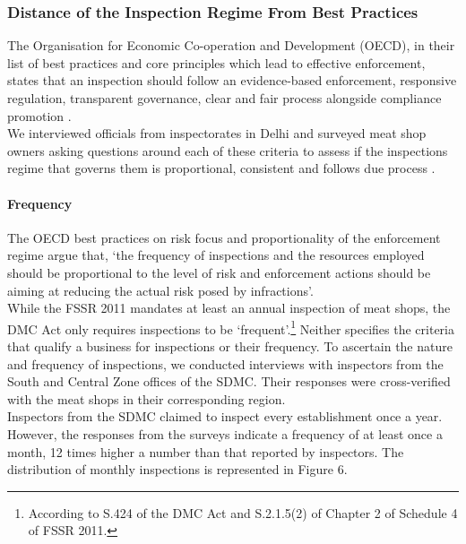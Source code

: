 \documentclass[a4paper, 12pt]{article}
\begin{document}
\subsubsection{Distance of the Inspection Regime From Best Practices}

The Organisation for Economic Co-operation and Development (OECD), in their list of best practices and core principles which lead to effective enforcement, states that an inspection should follow an evidence-based enforcement, responsive regulation, transparent governance, clear and fair process alongside compliance promotion \parencite{oecd1report}. \\

We interviewed officials from inspectorates in Delhi and surveyed meat shop owners asking questions around each of these criteria to assess if the inspections regime that governs them is proportional, consistent and follows due process \parencite{oecd1report}. \\ 

\paragraph{Frequency}
The OECD best practices on risk focus and proportionality of the enforcement regime argue that, ‘the frequency of inspections and the resources employed should be proportional to the level of risk and enforcement actions should be aiming at reducing the actual risk posed by infractions’. \\

While the FSSR 2011 mandates at least an annual inspection of meat shops, the DMC Act only requires inspections to be ‘frequent’.\footnote{According to S.424 of the DMC Act and S.2.1.5(2) of Chapter 2 of Schedule 4 of FSSR 2011.} Neither specifies the criteria that qualify a business for inspections or their frequency. To ascertain the nature and frequency of inspections, we conducted interviews with inspectors from the South and Central Zone offices of the SDMC. Their responses were cross-verified with the meat shops in their corresponding region. \\

Inspectors from the SDMC claimed to inspect every establishment once a year. However, the responses from the surveys indicate a frequency of at least once a month, 12 times higher a number than that reported by inspectors. The distribution of monthly inspections is represented in Figure 6. \\
\end{document}

